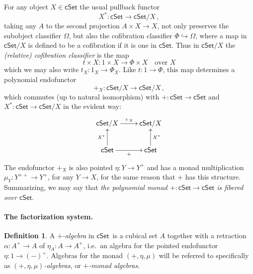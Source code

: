 \documentclass[11pt]{article}
\newcommand{\cSet}{\ensuremath{\mathsf{cSet}}}
\newcommand{\hook}{\ensuremath{\hookrightarrow}}
\theoremstyle{remark}
\theoremstyle{definition}
\newtheorem{definition}[theorem]{Definition}
\begin{document}
For any object $X\in\cSet$ the usual pullback functor $$X^* : \cSet \to \cSet/X\,,$$ taking any $A$ to the second projection $A\times X\to X$, not only preserves the subobject classifier $\Omega$, but also the cofibration classifier $\Phi \hook \Omega$, where a map in $\cSet/X$ is defined to be a cofibration if it is one in \cSet. Thus in $\cSet/X$ the \emph{(relative) cofibration classifier} is the map
\[
t \times X : 1\times X \to \Phi\times X	\quad\text{over $X$}
\]
which we may also write $t_X : 1_X \to \Phi_X$.  Like $t : 1\to \Phi$, this map determines a polynomial endofunctor  $$+_X : \cSet/X \to \cSet/X\,,$$ which commutes (up to natural isomorphism) with $+ : \cSet \to \cSet$ and $X^* : \cSet \to \cSet/X$ in the evident way:
\[
\xymatrix{
\cSet/X \ar[r]^{+_X}& \cSet/X \\
\cSet \ar[u]^{X^*} \ar[r]_+ & \ar[u]_{X^*}\cSet 
}
\]
The endofunctor $+_X$ is also pointed $\eta : Y \to Y^+$ and has a monad multiplication $\mu_Y : Y^{++} \to Y^+$, for any $Y\to X$, for the same reason that $+$ has this structure.  Summarizing, we may say that \emph{the polynomial monad $+ : \cSet \to \cSet$ is fibered over \cSet}.

\paragraph{The factorization system.}

\begin{definition}
A \emph{$+$-algebra} in \cSet\ is a cubical set $A$ together with a retraction $\alpha : A^+\to A$ of $\eta_A : A \to A^+$, i.e.\ an algebra for the pointed endofunctor $\eta : 1 \to (-)^+$.  Algebras for the monad $(+, \eta, \mu)$ will be referred to specifically as \emph{$(+, \eta, \mu)$-algebras}, or \emph{$+$-monad algebras}. 
\end{definition}
\end{document}
